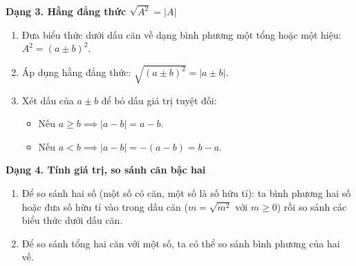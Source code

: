\textbf{Dạng 3. Hằng đẳng thức $\sqrt{A^2} = |A|$}
\begin{enumerate}
\item Đưa biểu thức dưới dấu căn về dạng bình phương một tổng hoặc một hiệu: $A^2 = (a \pm b)^2$.
\item Áp dụng hằng đẳng thức: $\sqrt{(a \pm b)^2} = |a \pm b|$.
\item Xét dấu của $a \pm b$ để bỏ dấu giá trị tuyệt đối:
\begin{itemize}
\item Nếu $a \ge b \implies |a - b| = a - b$.
\item Nếu $a < b \implies |a - b| = -(a - b) = b - a$.
\end{itemize}
\end{enumerate}

\textbf{Dạng 4. Tính giá trị, so sánh căn bậc hai}
\begin{enumerate}
\item Để so sánh hai số (một số có căn, một số là số hữu tỉ): ta bình phương hai số hoặc đưa số hữu tỉ vào trong dấu căn ($m = \sqrt{m^2}$ với $m \ge 0$) rồi so sánh các biểu thức dưới dấu căn.
\item Để so sánh tổng hai căn với một số, ta có thể so sánh bình phương của hai vế.
\end{enumerate}
